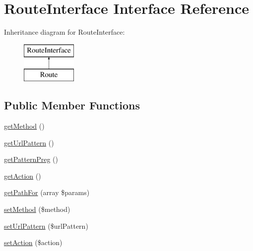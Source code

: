\hypertarget{interface_pes_1_1_router_1_1_route_interface}{}\section{Route\+Interface Interface Reference}
\label{interface_pes_1_1_router_1_1_route_interface}
Inheritance diagram for Route\+Interface\+:\begin{figure}[H]
\begin{center}
\leavevmode
\includegraphics[height=2.000000cm]{interface_pes_1_1_router_1_1_route_interface}
\end{center}
\end{figure}
\subsection*{Public Member Functions}
\begin{DoxyCompactItemize}
\item 
\mbox{\hyperlink{interface_pes_1_1_router_1_1_route_interface_af3e37e1a6ed9b8c87f86f659873a83b7}{get\+Method}} ()
\item 
\mbox{\hyperlink{interface_pes_1_1_router_1_1_route_interface_af9358000c7c8783880577ca3751a6984}{get\+Url\+Pattern}} ()
\item 
\mbox{\hyperlink{interface_pes_1_1_router_1_1_route_interface_a6ed58fc0798710107b88abfbc32871a1}{get\+Pattern\+Preg}} ()
\item 
\mbox{\hyperlink{interface_pes_1_1_router_1_1_route_interface_a189a4abe5faf11f4320d5d3f1d3d1715}{get\+Action}} ()
\item 
\mbox{\hyperlink{interface_pes_1_1_router_1_1_route_interface_acef55da58ed940134875f3d6acc5eb16}{get\+Path\+For}} (array \$params)
\item 
\mbox{\hyperlink{interface_pes_1_1_router_1_1_route_interface_a643c65610f8b3179a8c147cab7cbb652}{set\+Method}} (\$method)
\item 
\mbox{\hyperlink{interface_pes_1_1_router_1_1_route_interface_af41294828fa9f8f8d45605c7f5046f83}{set\+Url\+Pattern}} (\$url\+Pattern)
\item 
\mbox{\hyperlink{interface_pes_1_1_router_1_1_route_interface_a0366b3b0db0bd90abfc461c372f86599}{set\+Action}} (\$action)
\end{DoxyCompactItemize}


